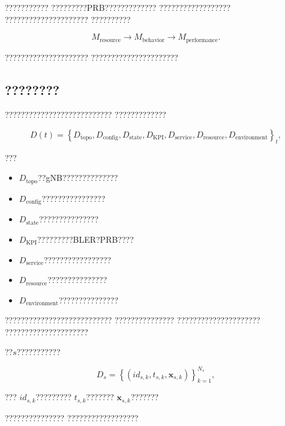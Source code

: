 ???????????
?????????PRB?????????????
??????????????????
?????????????????????
??????????

\begin{equation}
M_{\mathrm{resource}}
\rightarrow
M_{\mathrm{behavior}}
\rightarrow
M_{\mathrm{performance}}.
\label{eq:model_dependency_chain}
\end{equation}

?????????????????????
??????????????????????


\subsection*{????????}

???????????????????????????
?????????????

\begin{equation}
D(t)
=
\left\{
D_{\mathrm{topo}},
D_{\mathrm{config}},
D_{\mathrm{state}},
D_{\mathrm{KPI}},
D_{\mathrm{service}},
D_{\mathrm{resource}},
D_{\mathrm{environment}}
\right\}_{t},
\label{eq:twin_data_categories}
\end{equation}

???

\begin{itemize}
    \item $D_{\mathrm{topo}}$??gNB??????????????
    \item $D_{\mathrm{config}}$????????????????
    \item $D_{\mathrm{state}}$???????????????
    \item $D_{\mathrm{KPI}}$?????????BLER?PRB????
    \item $D_{\mathrm{service}}$?????????????????
    \item $D_{\mathrm{resource}}$???????????????
    \item $D_{\mathrm{environment}}$???????????????
\end{itemize}

???????????????????????????
???????????????
?????????????????????
?????????????????????

??$s$???????????

\begin{equation}
D_s
=
\left\{
\left(
id_{s,k},
t_{s,k},
\boldsymbol{x}_{s,k}
\right)
\right\}_{k=1}^{N_s},
\label{eq:raw_source_data}
\end{equation}

???
$id_{s,k}$?????????
$t_{s,k}$???????
$\boldsymbol{x}_{s,k}$???????

???????????????
??????????????????


